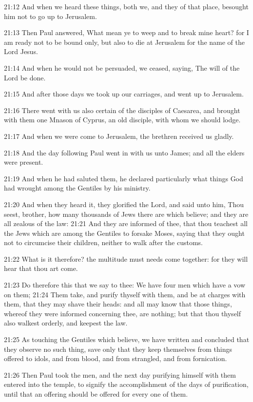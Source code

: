 21:12 And when we heard these things, both we, and they of that place,
besought him not to go up to Jerusalem.

21:13 Then Paul answered, What mean ye to weep and to break mine
heart?  for I am ready not to be bound only, but also to die at
Jerusalem for the name of the Lord Jesus.

21:14 And when he would not be persuaded, we ceased, saying, The will
of the Lord be done.

21:15 And after those days we took up our carriages, and went up to
Jerusalem.

21:16 There went with us also certain of the disciples of Caesarea,
and brought with them one Mnason of Cyprus, an old disciple, with whom
we should lodge.

21:17 And when we were come to Jerusalem, the brethren received us
gladly.

21:18 And the day following Paul went in with us unto James; and all
the elders were present.

21:19 And when he had saluted them, he declared particularly what
things God had wrought among the Gentiles by his ministry.

21:20 And when they heard it, they glorified the Lord, and said unto
him, Thou seest, brother, how many thousands of Jews there are which
believe; and they are all zealous of the law: 21:21 And they are
informed of thee, that thou teachest all the Jews which are among the
Gentiles to forsake Moses, saying that they ought not to circumcise
their children, neither to walk after the customs.

21:22 What is it therefore? the multitude must needs come together:
for they will hear that thou art come.

21:23 Do therefore this that we say to thee: We have four men which
have a vow on them; 21:24 Them take, and purify thyself with them, and
be at charges with them, that they may shave their heads: and all may
know that those things, whereof they were informed concerning thee,
are nothing; but that thou thyself also walkest orderly, and keepest
the law.

21:25 As touching the Gentiles which believe, we have written and
concluded that they observe no such thing, save only that they keep
themselves from things offered to idols, and from blood, and from
strangled, and from fornication.

21:26 Then Paul took the men, and the next day purifying himself with
them entered into the temple, to signify the accomplishment of the
days of purification, until that an offering should be offered for
every one of them.

